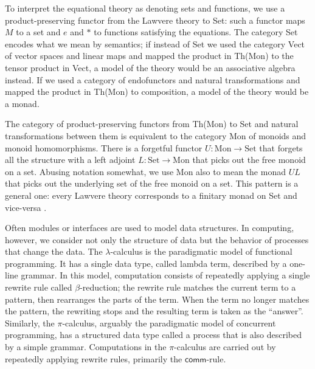 \documentclass{llncs}
\newcommand{\maps}{\colon}
\renewcommand{\:}{\colon}
\newcommand{\Set}{\mathrm{Set}}
\newcommand{\Mon}{\mathrm{Mon}}
\begin{document}
  To interpret the equational theory as denoting sets and functions,
  we use a product-preserving functor from the Lawvere theory to Set:
  such a functor maps $M$ to a set and $e$ and $*$ to functions
  satisfying the equations.  The category Set encodes what we mean by
  semantics; if instead of Set we used the category Vect of vector
  spaces and linear maps and mapped the product in Th(Mon) to the
  tensor product in Vect, a model of the theory would be an
  associative algebra instead.  If we used a category of endofunctors
  and natural transformations and mapped the product in Th(Mon) to
  composition, a model of the theory would be a monad.

  The category of product-preserving functors from Th(Mon) to Set and
  natural transformations between them is equivalent to the category
  Mon of monoids and monoid homomorphisms.  There is a forgetful
  functor $U\maps \Mon \to \Set$ that forgets all the structure with a
  left adjoint $L\maps \Set \to \Mon$ that picks out the free monoid
  on a set.  Abusing notation somewhat, we use Mon also to mean the
  monad $UL$ that picks out the underlying set of the free monoid on a
  set.  This pattern is a general one: every Lawvere theory
  corresponds to a finitary monad on Set and vice-versa
  \cite{DBLP:journals/entcs/HylandP07}.

  Often modules or interfaces are used to model data structures.  In
  computing, however, we consider not only the structure of data but
  the behavior of processes that change the data.  The
  $\lambda$-calculus is the paradigmatic model of functional
  programming.  It has a single data type, called lambda term,
  described by a one-line grammar.  In this model, computation
  consists of repeatedly applying a single rewrite rule called
  $\beta$-reduction; the rewrite rule matches the current term to a
  pattern, then rearranges the parts of the term.  When the term no
  longer matches the pattern, the rewriting stops and the resulting
  term is taken as the ``answer''.  Similarly, the $\pi$-calculus,
  arguably the paradigmatic model of concurrent programming, has a
  structured data type called a process that is also described by a
  simple grammar.  Computations in the $\pi$-calculus are carried out
  by repeatedly applying rewrite rules, primarily the
  $\mathsf{comm}$-rule.
\end{document}
